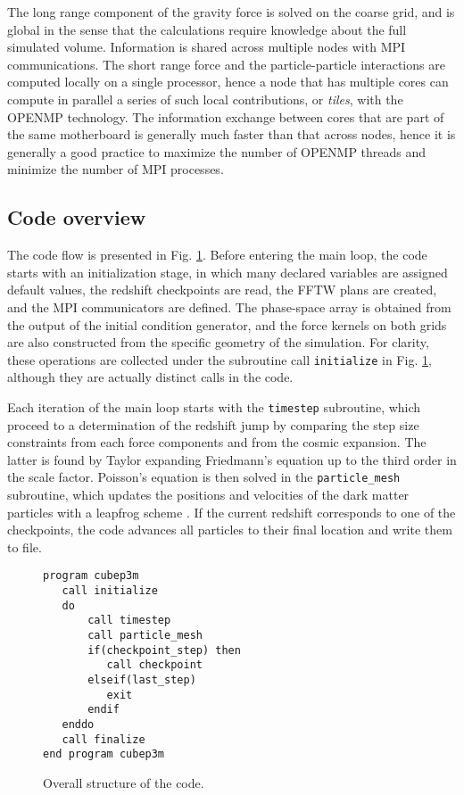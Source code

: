 The long range component of the gravity force is solved on the coarse grid, 
and is global in the sense that the calculations require knowledge about the full simulated volume.
Information is shared across multiple nodes with {\small MPI} communications. 
The short range force and the particle-particle interactions  are computed locally on a single processor,  
hence a node that has multiple cores can compute in parallel a series of such local contributions, or {\it tiles}, with the {\small OPENMP} technology.
The information exchange between cores that are part of the same motherboard is generally much faster than that across nodes,
hence it is generally a good practice to maximize the number of {\small OPENMP} threads and minimize the number of {\small MPI} processes.

\subsection{Code overview}
\label{subsec:overview}

The code flow is presented in Fig. \ref{fig:structure}.
Before entering the main loop, the code starts with an initialization stage, 
in which many declared variables are assigned default values,
the redshift checkpoints are read, the {\small FFTW} plans are created, and the {\small MPI} communicators are defined.
The phase-space array  is obtained from the output of the initial condition generator,
and the force kernels on both grids are also constructed from the specific geometry of the simulation.
For clarity, these operations are collected under the subroutine call {\tt initialize} in Fig. \ref{fig:structure}, 
although they are actually distinct calls in the code.

Each iteration of the main loop starts with the {\tt timestep} subroutine, 
which proceed to a determination of the redshift jump by comparing the step size constraints from each
force components and from the cosmic expansion.
The latter is found by Taylor expanding  Friedmann's equation up to the third order in the scale factor.
Poisson's equation is then solved  in the {\tt particle\_mesh} subroutine,
which updates the positions and velocities of the dark matter particles with a leapfrog scheme \citep{Hockney}.
If the current redshift corresponds to one of the checkpoints, the code advances all particles to their final location
and write them to file.

\begin{figure}
\begin{verbatim}
program cubep3m
   call initialize
   do
       call timestep
       call particle_mesh
       if(checkpoint_step) then
          call checkpoint
       elseif(last_step)
          exit
       endif
   enddo
   call finalize
end program cubep3m
\end{verbatim}
\caption{Overall structure of the code.}
\label{fig:structure}
\end{figure}

